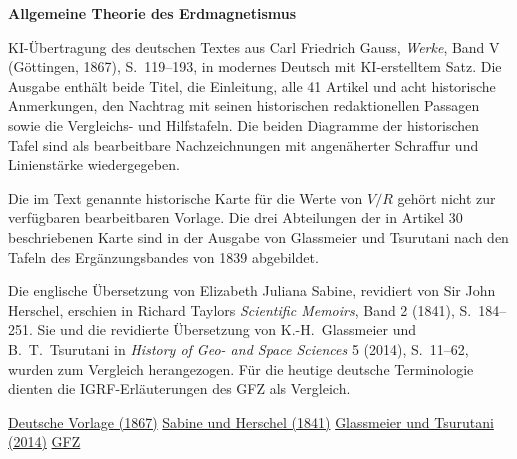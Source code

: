 \clearpage
\thispagestyle{empty}
\begin{center}\Large\textbf{Allgemeine Theorie des Erdmagnetismus}\end{center}

KI-Übertragung des deutschen Textes aus Carl Friedrich Gauss, \textit{Werke}, Band V (Göttingen, 1867), S.~119--193, in modernes Deutsch mit KI-erstelltem Satz. Die Ausgabe enthält beide Titel, die Einleitung, alle 41 Artikel und acht historische Anmerkungen, den Nachtrag mit seinen historischen redaktionellen Passagen sowie die Vergleichs- und Hilfstafeln. Die beiden Diagramme der historischen Tafel sind als bearbeitbare Nachzeichnungen mit angenäherter Schraffur und Linienstärke wiedergegeben.

Die im Text genannte historische Karte für die Werte von \(V/R\) gehört nicht zur verfügbaren bearbeitbaren Vorlage. Die drei Abteilungen der in Artikel 30 beschriebenen Karte sind in der Ausgabe von Glassmeier und Tsurutani nach den Tafeln des Ergänzungsbandes von 1839 abgebildet.

Die englische Übersetzung von Elizabeth Juliana Sabine, revidiert von Sir John Herschel, erschien in Richard Taylors \textit{Scientific Memoirs}, Band 2 (1841), S.~184--251. Sie und die revidierte Übersetzung von K.-H.~Glassmeier und B.~T.~Tsurutani in \textit{History of Geo- and Space Sciences} 5 (2014), S.~11--62, wurden zum Vergleich herangezogen. Für die heutige deutsche Terminologie dienten die IGRF-Erläuterungen des GFZ als Vergleich.

\noindent\href{https://gdz.sub.uni-goettingen.de/id/PPN236006339}{Deutsche Vorlage (1867)}\quad
\href{https://en.wikisource.org/wiki/Scientific_Memoirs/2/General_Theory_of_Terrestrial_Magnetism?oldid=4352379}{Sabine und Herschel (1841)}\quad
\href{https://doi.org/10.5194/hgss-5-11-2014}{Glassmeier und Tsurutani (2014)}\quad
\href{https://isdc.gfz.de/igrf-declination-calculator/erlaeuterungen-de/}{GFZ}
\clearpage
